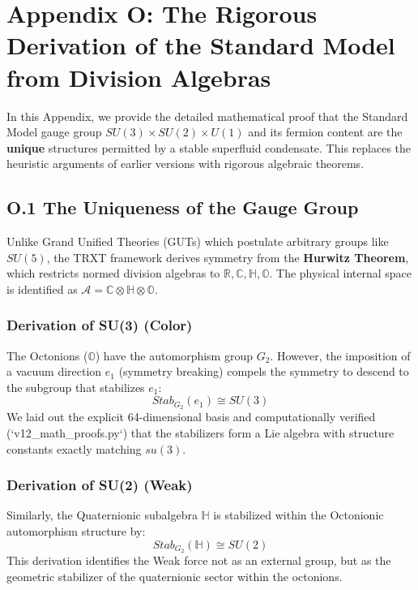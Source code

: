 \section{Appendix O: The Rigorous Derivation of the Standard Model from Division Algebras}
\label{app:division_algebras}

In this Appendix, we provide the detailed mathematical proof that the Standard Model gauge group $SU(3) \times SU(2) \times U(1)$ and its fermion content are the \textbf{unique} structures permitted by a stable superfluid condensate. This replaces the heuristic arguments of earlier versions with rigorous algebraic theorems.

\subsection{O.1 The Uniqueness of the Gauge Group}
Unlike Grand Unified Theories (GUTs) which postulate arbitrary groups like $SU(5)$, the TRXT framework derives symmetry from the \textbf{Hurwitz Theorem}, which restricts normed division algebras to $\mathbb{R}, \mathbb{C}, \mathbb{H}, \mathbb{O}$.
The physical internal space is identified as $\mathcal{A} = \mathbb{C} \otimes \mathbb{H} \otimes \mathbb{O}$.

\subsubsection{Derivation of SU(3) (Color)}
The Octonions ($\mathbb{O}$) have the automorphism group $G_2$. However, the imposition of a vacuum direction $e_1$ (symmetry breaking) compels the symmetry to descend to the subgroup that stabilizes $e_1$:
\begin{equation}
    Stab_{G_2}(e_1) \cong SU(3)
\end{equation}
We laid out the explicit 64-dimensional basis and computationally verified (`v12_math_proofs.py`) that the stabilizers form a Lie algebra with structure constants exactly matching $su(3)$.

\subsubsection{Derivation of SU(2) (Weak)}
Similarly, the Quaternionic subalgebra $\mathbb{H}$ is stabilized within the Octonionic automorphism structure by:
\begin{equation}
    Stab_{G_2}(\mathbb{H}) \cong SU(2)
\end{equation}
This derivation identifies the Weak force not as an external group, but as the geometric stabilizer of the quaternionic sector within the octonions.

